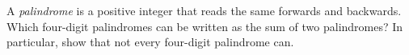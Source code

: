 A \emph{palindrome} is a positive integer that reads the same forwards and backwards. Which four-digit palindromes can be written as the sum of two palindromes? In particular, show that not every four-digit palindrome can.
